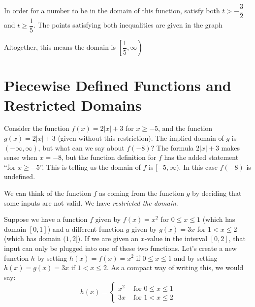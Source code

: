\documentclass[nooutcomes]{ximera}
\begin{document}
\begin{example}
\begin{explanation}
			In order for a number to be in the domain of this function, satisfy both $t > -\dfrac{3}{2}$ and $t \geq \dfrac{1}{5}$.
			The points satisfying both inequalities are given in the graph
			\begin{image}
			\end{image}
			
			Altogether, this means the domain is $\left[ \dfrac{1}{5}, \infty \right)$
		\end{explanation}
	\end{example}


\section{Piecewise Defined Functions and Restricted Domains}
	Consider the function $f(x) = 2|x|+3$ for $x \geq -5$, and the function $g(x) = 2|x|+3$ (given without this restriction).  The implied domain of $g$ is $(-\infty, \infty)$, 
	but what can we say about $f(-8)$? The formula $2|x|+3$ makes sense when $x=-8$, but the function 
	definition for $f$ has the added statement ``for $x \geq -5$''. This is telling us the domain of $f$ is $[-5, \infty)$. In this case $f(-8)$ is undefined. 
	
	We can think of the function $f$ as coming from the function $g$ by deciding that some inputs are not valid. We have \emph{restricted the domain}.
	
	Suppose we have a function $f$ given by $f(x)=x^2$ for $0\leq x \leq 1$ (which has domain $[0,1]$) and a different function $g$ given by
	$g(x) = 3x$ for $1 < x \leq 2$ (which has domain $(1, 2]$). If we are given an $x$-value in the interval $[0,2]$, that input can only be
	plugged into one of these two functions. Let's create a new function $h$ by setting $h(x) = f(x) = x^2$ if $0\leq x \leq 1$ and by setting 
	$h(x) = g(x)=3x$ if $1 < x \leq 2$. As a compact way of writing this, we would say:
	$$ h(x) = \begin{cases} x^2 & \text{ for } 0 \leq x \leq 1 \\ 3x & \text{ for } 1 < x \leq 2\end{cases}$$
	
\end{document}
